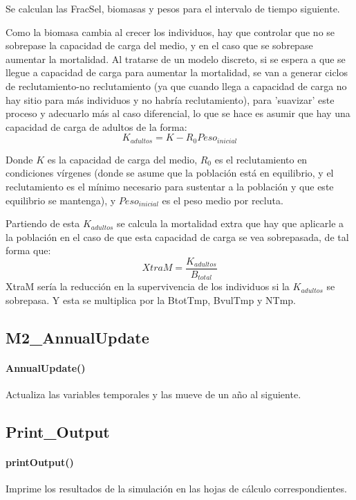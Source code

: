 				Se calculan las FracSel, biomasas y pesos para el intervalo de tiempo siguiente. 
				
				Como la biomasa cambia al crecer los individuos, hay que controlar que no se sobrepase la capacidad de carga del medio, y en el caso que se sobrepase aumentar la mortalidad. Al tratarse de un modelo discreto, si se espera a que se llegue a capacidad de carga para aumentar la mortalidad, se van a generar ciclos de reclutamiento-no reclutamiento (ya que cuando llega a capacidad de carga no hay sitio para más individuos y no habría reclutamiento), para 'suavizar' este proceso y adecuarlo más al caso diferencial, lo que se hace es asumir que hay una capacidad de carga de adultos de la forma:
				\begin{equation}
					K_{adultos}= K - R_0 Peso_{inicial}
				\end{equation}
				  
				 Donde $K$ es la capacidad de carga del medio, $R_0$ es el reclutamiento en condiciones vírgenes (donde se asume que la población está en equilibrio, y el reclutamiento es el mínimo necesario para sustentar a la población y que este equilibrio se mantenga), y $Peso_{inicial}$ es el peso medio por recluta. 
				 
				 Partiendo de esta $K_{adultos}$ se calcula la mortalidad extra que hay que aplicarle a la población en el caso de que esta capacidad de carga se vea sobrepasada, de tal forma que:
				\begin{equation}
					XtraM= \frac{K_{adultos}}{B_{total}} 
				\end{equation}
				 XtraM sería la reducción en la supervivencia de los individuos si la $K_{adultos}$ se sobrepasa. Y esta se multiplica por la BtotTmp, BvulTmp y NTmp.
				
		\subsection{M2\_AnnualUpdate}
			\paragraph{AnnualUpdate()} Actualiza las variables temporales y las mueve de un año al siguiente. 
			
		\subsection{Print\_Output}
			\paragraph{printOutput()} Imprime los resultados de la simulación en las hojas de cálculo correspondientes.
			
